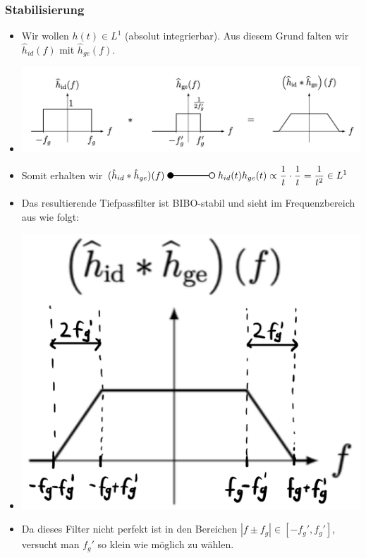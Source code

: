 \documentclass[11pt]{article}
\newcommand{\invtransform}[2]{%
    \begin{tikzpicture}
        \filldraw[thick] (0,0) circle (0.1);
        \draw[thick] (0.1,0) -- (#2 -0.1,0) node[midway, above] {#1};
        \draw[thick] (#2,0) circle (0.1);
    \end{tikzpicture}%
}
\begin{document}
\vspace*{-0.5cm}
\subsubsection*{Stabilisierung}
\vspace*{-0.5cm}
\begin{itemize}[leftmargin=0pt]
    \item[] Wir wollen $h(t) \in L^1$ (absolut integrierbar). Aus diesem Grund falten wir $\hat{h}_{id}(f)$ mit $\hat{h}_{ge}(f)$.
    \item[] \begin{center}
        \includegraphics[width=0.7\linewidth]{docimgs/h_stabil_freq.png}
    \end{center}
    \item[] Somit erhalten wir $(\hat{h}_{id} \ast \hat{h}_{ge})(f) \; \invtransform{}{1.5} \; h_{id}(t) h_{ge}(t) \propto \displaystyle\frac{1}{t} \cdot \displaystyle\frac{1}{t} = \displaystyle\frac{1}{t^2} \in L^1$
    \item[] Das resultierende Tiefpassfilter ist BIBO-stabil und sieht im Frequenzbereich aus wie folgt:
    \item[] \begin{center}
        \includegraphics[width=0.2\linewidth]{docimgs/h_stabil_2.jpg}
    \end{center}
    \item[] Da dieses Filter nicht perfekt ist in den Bereichen $|f \pm f_g| \in [-f_g', f_g']$, versucht man $f_g'$ so klein wie möglich zu wählen.
\end{itemize}

\pagebreak
\end{document}
